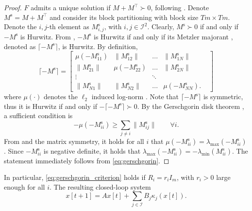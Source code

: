 \documentclass[letterpaper, 10 pt, conference]{ieeeconf}  %
\newcommand{\mc}{\mathcal}
\newcommand{\Ms}{M^{\mathrm{s}}}
\begin{document}
\begin{proof}
$F$ admits a unique solution if $M+M^{\top}\succ 0$, following \cite[Proposition 2.3.2]{facchinei_finite-dimensional_2007}. Denote $\Ms = M + M^{\top}$ and consider its block partitioning with block size $Tm\times Tm$. Denote the $i,j$-th element as $\Ms_{i,j}$, with $i,j\in\mc I^2$. Clearly, $\Ms\succ 0$ if and only if $-\Ms$ is Hurwitz. From \cite[Corollary 2.34]{bullo_contraction_2024}, $-\Ms$ is Hurwitz if and only if its Metzler majorant \cite[\S 2.2]{bullo_contraction_2024}, denoted as $\lceil -\Ms \rceil$, is Hurwitz. By definition, 
\begin{equation}
    \lceil -\Ms \rceil = \begin{bmatrix} \mu(-\Ms_{11}) & \|\Ms_{12}\| & ... & \|\Ms_{1N}\| \\
        \|\Ms_{21}\| & \mu(-\Ms_{22}) & ... & \|\Ms_{2N}\| \\
        \vdots &  & \ddots & & \\
        \|\Ms_{N1}\| & \|\Ms_{N2}\| & ... & \mu(-\Ms_{NN}).
    \end{bmatrix}
\end{equation}
where $\mu(\cdot)$ denotes the $\ell_2$ induced log-norm \cite[Eq. 2.23]{bullo_contraction_2024}. Note that $\lceil -\Ms \rceil$ is symmetric, thus it is Hurwitz if and only if $-\lceil -\Ms \rceil\succ 0$. By the Gerschgorin disk theorem \cite[Theorem 2.8]{bullo_lectures_2024}, a sufficient condition is
\begin{equation} \label{eq:gerschgorin}
	-\mu(-\Ms_{ii}) \geq \sum_{j\neq i} \|\Ms_{ij}\| \qquad \forall i.
\end{equation}
From \cite[Example 2.25]{bullo_contraction_2024} and the matrix symmetry, it holds for all $i$ that $\mu(-\Ms_{ii}) = \lambda_{\text{max}}(-\Ms_{ii})$. Since $-\Ms_{ii}$ is negative definite, it holds that $\lambda_{\text{max}}(-\Ms_{ii}) = -\lambda_{\text{min}}(\Ms_{ii}) $. The statement immediately follows from \eqref{eq:gerschgorin}.
\end{proof}
In particular, \eqref{eq:gerschgorin_criterion} holds if $R_i=r_iI_m$, with $r_i>0$ large enough for all $i$. The resulting closed-loop system 
\begin{equation}\label{eq:closed_loop_dyn}
    x[t+1] = Ax[t] + \sum_{j\in\mc I} B_j \kappa_j(x[t]).
\end{equation}
\end{document}
